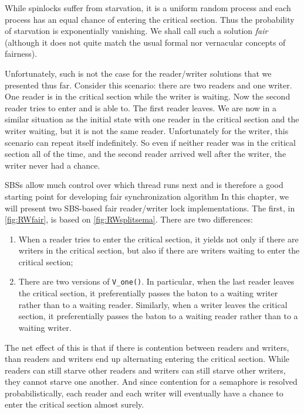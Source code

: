 \documentclass{report}
\begin{document}
While spinlocks suffer from starvation, it is a uniform random
process and each process has an equal chance of entering the critical
section.  Thus the probability of starvation is exponentially vanishing.
We shall call such a solution \emph{fair}
%
(although it does not quite
match the usual formal nor vernacular concepts of fairness).

%

Unfortunately, such is not the case for the
reader/writer solutions that we presented thus far.
Consider this scenario: there are two readers and one writer.  One reader
is in the critical section while the writer is waiting.  Now the
second reader tries to enter and is able to.  The first reader leaves.
We are now in a similar situation as the initial state with one reader
in the critical section and the writer waiting, but it is not the same
reader.  Unfortunately for the writer, this scenario can repeat itself
indefinitely.  So even if neither reader was in the critical section
all of the time, and the second reader arrived well after the writer,
the writer never had a chance.

SBSs allow much control over which thread runs next and is therefore a
good starting point for developing fair synchronization algorithm
In this chapter, we will present two SBS-based fair reader/writer lock
implementations.
The first, in \autoref{fig:RWfair}, is based on \autoref{fig:RWsplitsema}.
There are two differences:

\begin{enumerate}
\item When a reader tries to enter the critical section, it yields not only
if there are writers in the critical section, but also if there are writers
waiting to enter the critical section;
\item There are two versions of \texttt{V\_one()}.  In particular, when the
last reader leaves the critical section, it preferentially passes the baton
to a waiting writer rather than to a waiting reader.  Similarly,
when a writer leaves the critical section, it preferentially passes
the baton to a waiting reader rather than to a waiting writer.
\end{enumerate}

The net effect of this is that if there is contention between readers and
writers, than readers and writers end up alternating entering the critical
section.  While readers can still starve other readers and writers can still
starve other writers, they cannot starve one another.  And since contention for
a semaphore is resolved probabilistically, each reader and each writer will
eventually have a chance to enter the critical section almost surely.
\end{document}
